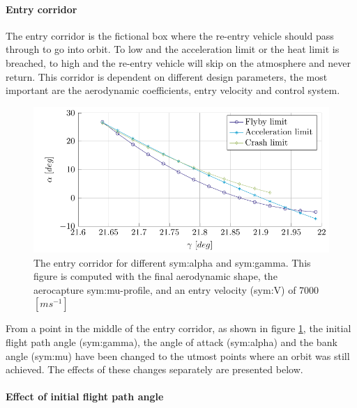 \paragraph{Entry corridor}

The entry corridor is the fictional box where the re-entry vehicle should pass through to go into orbit. To low and the acceleration limit or the heat limit is breached, to high and the re-entry vehicle will skip on the atmosphere and never return. This corridor is dependent on different design parameters, the most important are the aerodynamic coefficients, entry velocity and control system.

\begin{figure}[h]
	\centering
	\includegraphics[width=\textwidth]{./Figure/orbit/alpha_gamma.pdf}
	\caption{The entry corridor for different \gls{sym:alpha} and \gls{sym:gamma}. This figure is computed with the final aerodynamic shape, the aerocapture \gls{sym:mu}-profile, and an entry velocity (\gls{sym:V}) of 7000 $\left[m s^{-1}\right]$}
	\label{fig:alpha_gamma}
\end{figure}

From a point in the middle of the entry corridor, as shown in figure \ref{fig:alpha_gamma}, the initial flight path angle (\gls{sym:gamma}), the angle of attack (\gls{sym:alpha}) and the bank angle (\gls{sym:mu}) have been changed to the utmost points where an orbit was still achieved. The effects of these changes separately are presented below.

\paragraph{Effect of initial flight path angle}


